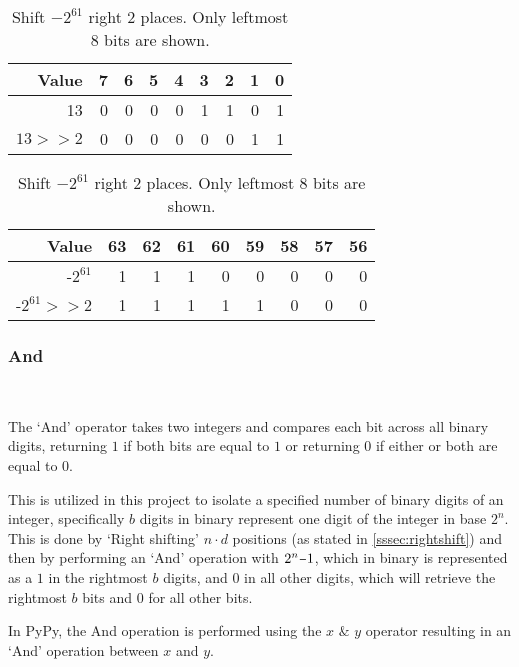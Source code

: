 \documentclass[12pt]{article}
\newcommand{\minus}{\scalebox{0.75}[1.0]{$-$}}
\begin{document}
\begin{table}[!htb]
	
\setlength{\tabcolsep}{4.5pt}
\begin{minipage}{.45\textwidth}
	\centering

		\begin{tabular}[t]{r|rrrrrrrr}
			\hline
			 Value   &   7 &   6 &   5 &   4 &   3 &   2 &   1 &   0 \\
			 \hline
			 13      &   0 &   0 &   0 &   0 &   1 &   1 &   0 &   1 \\
			 $13 \ensuremath{>}\ensuremath{>} 2$ &   0 &   0 &   0 &   0 &   0 &   0 &   1 &   1 \\
			 \hline
		\end{tabular}

	\caption{Shift 13 right 2 bits. Only rightmost 8 bits are shown}
	
\end{minipage}\hfill%
	\begin{minipage}{.55\textwidth}
		\centering

		\begin{tabular}[t]{r|rrrrrrrr}
			\hline
			 Value   &   63 &  62 &   61 &   60 &   59 &   58 &   57 &   56 \\
			\hline
			 -$2^{61}$      &   1 &    1 &    1 &    0 &    0 &    0 &    0 &    0 \\
			 -$2^{61} \ensuremath{>}\ensuremath{>} 2$ &    1 &    1 &    1 &    1 &    1 &    0 &    0 &    0 \\
			\hline
		\end{tabular}



		\caption{Shift $-2^{61}$ right 2 places. Only leftmost 8 bits are shown.}
		\label{table2}
	\end{minipage}\hfill%

\end{table}
\pagebreak
\subsubsection{And}\
\label{sssec:and}
\par
The `And' operator takes two integers and compares each bit across all binary digits, returning $1$ if both bits are equal to $1$ or returning $0$ if either or both are equal to $0$.
\par
 This is utilized in this project to isolate a specified number of binary digits of an integer, specifically $b$ digits in binary represent one digit of the integer in base $2^{n}$. This is done by `Right shifting' $n \cdot d$ positions (as stated in \ref{sssec:rightshift}) and then by performing an `And' operation with $2^{n}\minus1$, which in binary is represented as a $1$ in the rightmost $b$ digits, and 0 in all other digits, which will retrieve the rightmost $b$ bits and 0 for all other bits.
\par
In PyPy, the And operation is performed using the  $x$ $\&$ $y$ operator resulting in an `And' operation between $x$ and $y$.
\par
\end{document}
